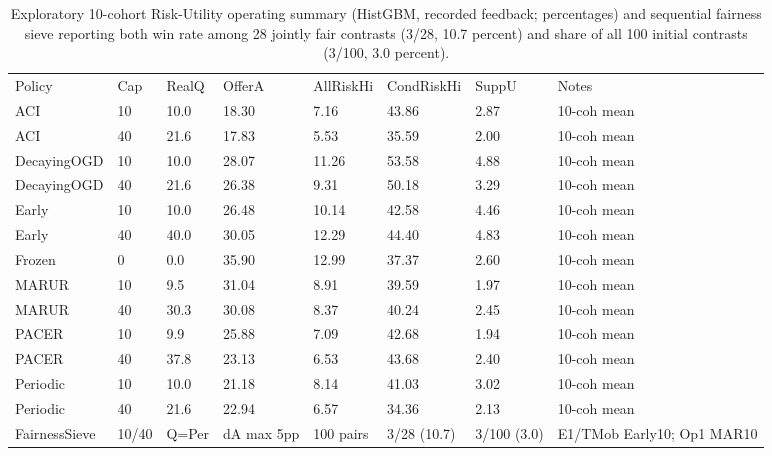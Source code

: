 \begin{table}[!ht]
\centering\footnotesize\setlength{\tabcolsep}{3.5pt}
\caption{Exploratory 10-cohort Risk-Utility operating summary (HistGBM, recorded feedback; percentages) and sequential fairness sieve reporting both win rate among 28 jointly fair contrasts (3/28, 10.7 percent) and share of all 100 initial contrasts (3/100, 3.0 percent).}
\begin{tabular}{llllllll}
\hline
Policy & Cap & RealQ & OfferA & AllRiskHi & CondRiskHi & SuppU & Notes \\
ACI & 10 & 10.0 & 18.30 & 7.16 & 43.86 & 2.87 & 10-coh mean \\
ACI & 40 & 21.6 & 17.83 & 5.53 & 35.59 & 2.00 & 10-coh mean \\
DecayingOGD & 10 & 10.0 & 28.07 & 11.26 & 53.58 & 4.88 & 10-coh mean \\
DecayingOGD & 40 & 21.6 & 26.38 & 9.31 & 50.18 & 3.29 & 10-coh mean \\
Early & 10 & 10.0 & 26.48 & 10.14 & 42.58 & 4.46 & 10-coh mean \\
Early & 40 & 40.0 & 30.05 & 12.29 & 44.40 & 4.83 & 10-coh mean \\
Frozen & 0 & 0.0 & 35.90 & 12.99 & 37.37 & 2.60 & 10-coh mean \\
MARUR & 10 & 9.5 & 31.04 & 8.91 & 39.59 & 1.97 & 10-coh mean \\
MARUR & 40 & 30.3 & 30.08 & 8.37 & 40.24 & 2.45 & 10-coh mean \\
PACER & 10 & 9.9 & 25.88 & 7.09 & 42.68 & 1.94 & 10-coh mean \\
PACER & 40 & 37.8 & 23.13 & 6.53 & 43.68 & 2.40 & 10-coh mean \\
Periodic & 10 & 10.0 & 21.18 & 8.14 & 41.03 & 3.02 & 10-coh mean \\
Periodic & 40 & 21.6 & 22.94 & 6.57 & 34.36 & 2.13 & 10-coh mean \\
FairnessSieve & 10/40 & Q=Per & dA max 5pp & 100 pairs & 3/28 (10.7) & 3/100 (3.0) & E1/TMob Early10; Op1 MAR10 \\
\hline
\end{tabular}
\end{table}
